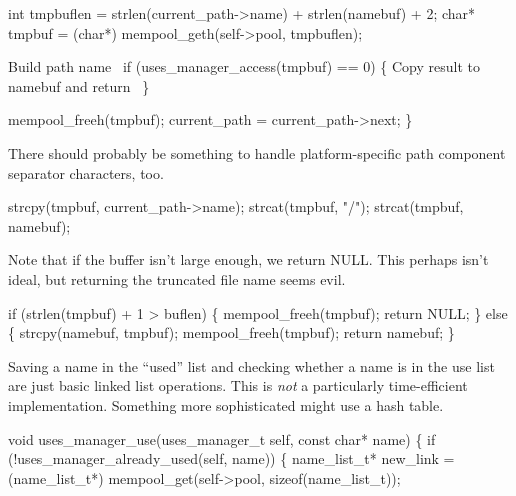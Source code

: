     int tmpbuflen = strlen(current_path->name) +
                    strlen(namebuf) + 2;
    char* tmpbuf = (char*) mempool_geth(self->pool, tmpbuflen);

    \LA{}Build path name~{\nwtagstyle{}}\RA{}
    if (uses_manager_access(tmpbuf) == 0) \{
        \LA{}Copy result to namebuf and return~{\nwtagstyle{}}\RA{}
    \}
    
    mempool_freeh(tmpbuf);
    current_path = current_path->next;
\}
\nwendcode{}\nwdocspar

There should probably be something to handle platform-specific
path component separator characters, too.

\nwenddocs{}\endmoddef
strcpy(tmpbuf, current_path->name);
strcat(tmpbuf, "/");
strcat(tmpbuf, namebuf);
\nwendcode{}\nwdocspar

Note that if the buffer isn't large enough, we return NULL.
This perhaps isn't ideal, but returning the truncated file name
seems evil.

\nwenddocs{}\endmoddef
if (strlen(tmpbuf) + 1 > buflen) \{
    mempool_freeh(tmpbuf);
    return NULL;
\} else \{
    strcpy(namebuf, tmpbuf);
    mempool_freeh(tmpbuf);
    return namebuf;
\}
\nwendcode{}\nwdocspar

Saving a name in the ``used'' list and checking whether a name
is in the use list are just basic linked list operations.
This is \emph{not} a particularly time-efficient implementation.
Something more sophisticated might use a hash table.

\nwenddocs{}\plusendmoddef
void uses_manager_use(uses_manager_t self, const char* name)
\{
    if (!uses_manager_already_used(self, name)) \{
        name_list_t* new_link = (name_list_t*)
            mempool_get(self->pool, sizeof(name_list_t));

